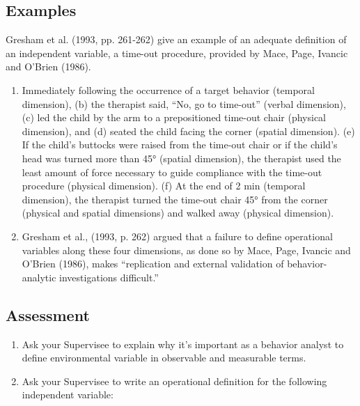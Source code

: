 \subsection{Examples}
Gresham et al. (1993, pp. 261-262) give an example of an adequate definition of an independent variable, a time-out procedure, provided by Mace, Page, Ivancic and O'Brien (1986).
\begin{enumerate}
\item Immediately following the occurrence of a target behavior (temporal dimension), (b) the therapist said, ``No, go to time-out'' (verbal dimension), (c) led the child by the arm to a prepositioned time-out chair (physical dimension), and (d) seated the child facing the corner (spatial dimension). (e) If the child's buttocks were raised from the time-out chair or if the child's head was turned more than 45° (spatial dimension), the therapist used the least amount of force necessary to guide compliance with the time-out procedure (physical dimension). (f) At the end of 2 min (temporal dimension), the therapist turned the time-out chair 45° from the corner (physical and spatial dimensions) and walked away (physical dimension).
\item Gresham et al., (1993, p. 262) argued that a failure to define operational variables along these four dimensions, as done so by Mace, Page, Ivancic and O'Brien (1986), makes ``replication and external validation of behavior-analytic investigations difficult.''
\end{enumerate}
%
\subsection{Assessment}
\begin{enumerate}
\item Ask your Supervisee to explain why it's important as a behavior analyst to define environmental variable in observable and measurable terms. 
\item Ask your Supervisee to write an operational definition for the following independent variable:
%
\end{enumerate}
%
